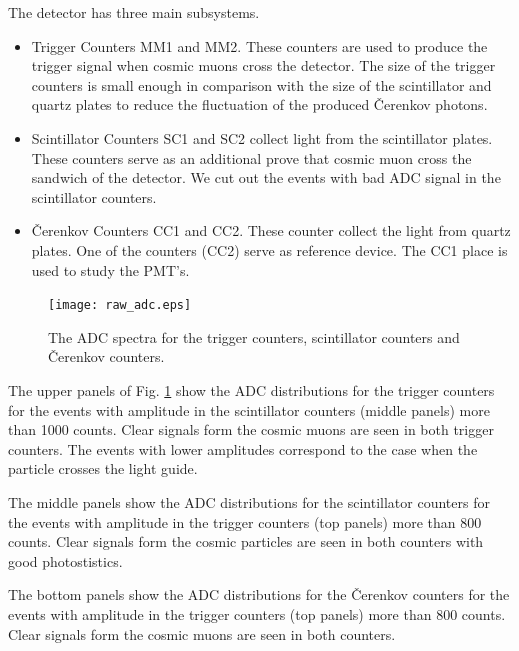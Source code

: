 \documentclass[11pt,titlepage]{article}
\begin{document}
The detector has three main subsystems.
\begin{itemize}
\item Trigger Counters MM1 and MM2. These counters are used to produce the trigger signal
when cosmic muons cross the detector. The size of the trigger counters is small enough
in comparison with the size of the scintillator and quartz plates to reduce the
fluctuation of the produced \v Cerenkov photons.
\item Scintillator Counters SC1 and SC2 collect light from the scintillator plates.
These counters serve as an additional prove that cosmic muon cross the sandwich
of the detector. We cut out the events with bad ADC signal in the scintillator counters.
\item \v Cerenkov Counters CC1 and CC2. These counter collect the light from quartz plates. One of the
counters (CC2) serve as reference device. The CC1 place is used to study the  PMT's.
\end{itemize}




 \begin{figure}
 \hspace{0.5cm}
 \begin{centering}
  \texttt{[image: raw\_adc.eps]}
 \vspace{-1.0cm}
 \caption{\label{stand_raw}
The ADC spectra for the trigger counters, scintillator counters and \v Cerenkov counters.
}
 \end{centering}
 \end{figure}

The upper panels of Fig. \ref{stand_raw} show the ADC distributions for the trigger counters for the events
with amplitude in the scintillator counters (middle panels) more than 1000 counts.
Clear signals form the cosmic muons are seen in  both trigger counters. The events with 
lower amplitudes correspond to the case when the particle crosses the light guide.

The middle panels show the ADC distributions for the scintillator counters for the events
with amplitude in the trigger counters (top  panels) more than 800 counts.
Clear signals form the cosmic particles are seen in  both counters with good photostistics.

The bottom panels show the ADC distributions for the \v Cerenkov counters for the events
with amplitude in the trigger counters (top  panels) more than 800 counts.
Clear signals form the cosmic muons are seen in both counters.
\end{document}
